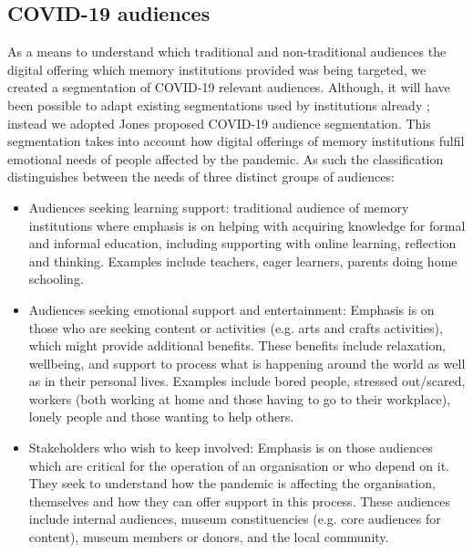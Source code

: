 \documentclass{egpubl}
\begin{document}
\subsection{COVID-19 audiences}
As a means to understand which traditional and non-traditional audiences the digital offering which memory institutions provided was being targeted, we created a segmentation of COVID-19 relevant audiences. Although, it will have been possible to adapt existing segmentations used by institutions already \cite{Drot19}; instead we adopted Jones \cite{Audiences2020} proposed COVID-19 audience segmentation. This segmentation takes into account how digital offerings of memory institutions fulfil emotional needs of people affected by the pandemic. As such the classification distinguishes between the needs of three distinct groups of audiences: 

\begin{itemize}
	\item Audiences seeking learning support: traditional audience of memory institutions where emphasis is on helping with acquiring knowledge for formal and informal education, including supporting with online learning, reflection and thinking. Examples include teachers, eager learners, parents doing home schooling.
	\item Audiences seeking emotional support and entertainment: Emphasis is on those who are seeking content or activities (e.g. arts and crafts activities), which might provide additional benefits. These benefits include relaxation, wellbeing, and support to process what is happening around the world as well as in their personal lives. Examples include bored people, stressed out/scared, workers (both working at home and those having to go to their workplace), lonely people and those wanting to help others. 
	\item Stakeholders who wish to keep involved: Emphasis is on those audiences which are critical for the operation of an organisation or who depend on it. They seek to understand how the pandemic is affecting the organisation, themselves and how they can offer support in this process. These audiences include internal audiences, museum constituencies (e.g. core audiences for content), museum members or donors, and the local community.
\end{itemize}
\end{document}
